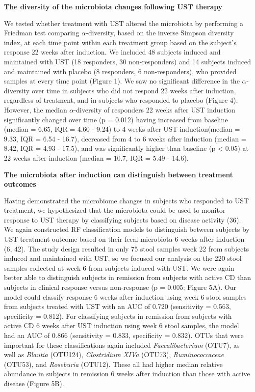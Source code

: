 \documentclass[12pt,]{article}
\begin{document}
\textbf{The diversity of the microbiota changes following UST therapy}

We tested whether treatment with UST altered the microbiota by
performing a Friedman test comparing \({\alpha}\)-diversity, based on
the inverse Simpson diversity index, at each time point within each
treatment group based on the subject's response 22 weeks after
induction. We included 48 subjects induced and maintained with UST (18
responders, 30 non-responders) and 14 subjects induced and maintained
with placebo (8 responders, 6 non-responders), who provided samples at
every time point (Figure 1). We saw no significant difference in the
\({\alpha}\)-diversity over time in subjects who did not respond 22
weeks after induction, regardless of treatment, and in subjects who
responded to placebo (Figure 4). However, the median
\({\alpha}\)-diversity of responders 22 weeks after UST induction
significantly changed over time (p = 0.012) having increased from
baseline (median = 6.65, IQR = 4.60 - 9.24) to 4 weeks after UST
induction(median = 9.33, IQR = 6.54 - 16.7), decreased from 4 to 6 weeks
after induction (median = 8.42, IQR = 4.93 - 17.5), and was
significantly higher than baseline (p \textless{} 0.05) at 22 weeks
after induction (median = 10.7, IQR = 5.49 - 14.6).

\textbf{The microbiota after induction can distinguish between treatment
outcomes}

Having demonstrated the microbiome changes in subjects who responded to
UST treatment, we hypothesized that the microbiota could be used to
monitor response to UST therapy by classifying subjects based on disease
activity (36). We again constructed RF classification models to
distinguish between subjects by UST treatment outcome based on their
fecal microbiota 6 weeks after induction (6, 42). The study design
resulted in only 75 stool samples week 22 from subjects induced and
maintained with UST, so we focused our analysis on the 220 stool samples
collected at week 6 from subjects induced with UST. We were again better
able to distinguish subjects in remission from subjects with active CD
than subjects in clinical response versus non-response (p = 0.005;
Figure 5A). Our model could classify response 6 weeks after induction
using week 6 stool samples from subjects treated with UST with an AUC of
0.720 (sensitivity = 0.563, specificity = 0.812). For classifying
subjects in remission from subjects with active CD 6 weeks after UST
induction using week 6 stool samples, the model had an AUC of 0.866
(sensitivity = 0.833, specificity = 0.832). OTUs that were important for
these classifications again included \emph{Faecalibacterium} (OTU7), as
well as \emph{Blautia} (OTU124), \emph{Clostridium XIVa} (OTU73),
\emph{Ruminococcaceae} (OTU53), and \emph{Roseburia} (OTU12). These all
had higher median relative abundance in subjects in remission 6 weeks
after induction than those with active disease (Figure 5B).
\end{document}
